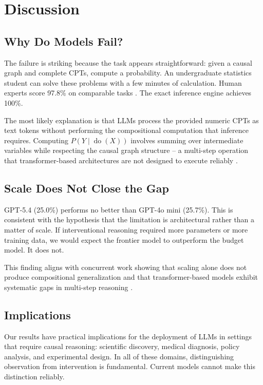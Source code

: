 \documentclass[11pt,a4paper]{article}
\begin{document}
\section{Discussion}

\subsection{Why Do Models Fail?}

The failure is striking because the task appears straightforward: given a causal graph and complete CPTs, compute a probability. An undergraduate statistics student can solve these problems with a few minutes of calculation. Human experts score 97.8\% on comparable tasks \cite{counterbench}. The exact inference engine achieves 100\%.

The most likely explanation is that LLMs process the provided numeric CPTs as text tokens without performing the compositional computation that inference requires. Computing $P(Y \mid \operatorname{do}(X))$ involves summing over intermediate variables while respecting the causal graph structure -- a multi-step operation that transformer-based architectures are not designed to execute reliably \cite{feng2024compositional,dziri2024faithful}.

\subsection{Scale Does Not Close the Gap}

GPT-5.4 (25.0\%) performs no better than GPT-4o mini (25.7\%). This is consistent with the hypothesis that the limitation is architectural rather than a matter of scale. If interventional reasoning required more parameters or more training data, we would expect the frontier model to outperform the budget model. It does not.

This finding aligns with concurrent work showing that scaling alone does not produce compositional generalization \cite{anil2022scaling,press2022scaling} and that transformer-based models exhibit systematic gaps in multi-step reasoning \cite{ezzini2024transformers}.

\subsection{Implications}

Our results have practical implications for the deployment of LLMs in settings that require causal reasoning: scientific discovery, medical diagnosis, policy analysis, and experimental design. In all of these domains, distinguishing observation from intervention is fundamental. Current models cannot make this distinction reliably.
\end{document}
